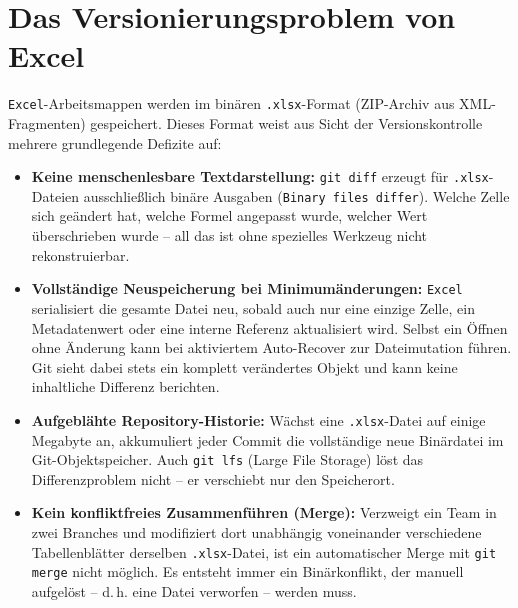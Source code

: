 ﻿\documentclass[12pt,a4paper]{report}
\theoremstyle{definition}
\theoremstyle{remark}
\newcommand{\excel}{\texttt{Excel}}
\newcommand{\code}[1]{\texttt{#1}}
\begin{document}
\section{Das Versionierungsproblem von Excel}

\excel-Arbeitsmappen werden im binären \code{.xlsx}-Format (ZIP-Archiv aus
XML-Fragmenten) gespeichert. Dieses Format weist aus Sicht der
Versionskontrolle mehrere grundlegende Defizite auf:

\begin{itemize}[leftmargin=1.5em, itemsep=3pt]
  \item \textbf{Keine menschenlesbare Textdarstellung:}
        \code{git diff} erzeugt für \code{.xlsx}-Dateien ausschließlich
        binäre Ausgaben (\code{Binary files differ}).
        Welche Zelle sich geändert hat, welche Formel angepasst wurde,
        welcher Wert überschrieben wurde -- all das ist ohne spezielles
        Werkzeug nicht rekonstruierbar.

  \item \textbf{Vollständige Neuspeicherung bei Minimumänderungen:}
        \excel{} serialisiert die gesamte Datei neu, sobald auch nur eine
        einzige Zelle, ein Metadatenwert oder eine interne Referenz
        aktualisiert wird. Selbst ein Öffnen ohne Änderung kann bei
        aktiviertem Auto-Recover zur Dateimutation führen. Git sieht
        dabei stets ein komplett verändertes Objekt und kann keine
        inhaltliche Differenz berichten.

  \item \textbf{Aufgeblähte Repository-Historie:}
        Wächst eine \code{.xlsx}-Datei auf einige Megabyte an, akkumuliert
        jeder Commit die vollständige neue Binärdatei im
        Git-Objektspeicher. Auch \code{git lfs} (Large File Storage)
        löst das Differenzproblem nicht -- er verschiebt nur den
        Speicherort.

  \item \textbf{Kein konfliktfreies Zusammenführen (Merge):}
        Verzweigt ein Team in zwei Branches und modifiziert dort
        unabhängig voneinander verschiedene Tabellenblätter derselben
        \code{.xlsx}-Datei, ist ein automatischer Merge mit
        \code{git merge} nicht möglich. Es entsteht immer ein
        Binärkonflikt, der manuell aufgelöst -- d.\,h. eine Datei
        verworfen -- werden muss.


\end{itemize}
\end{document}
